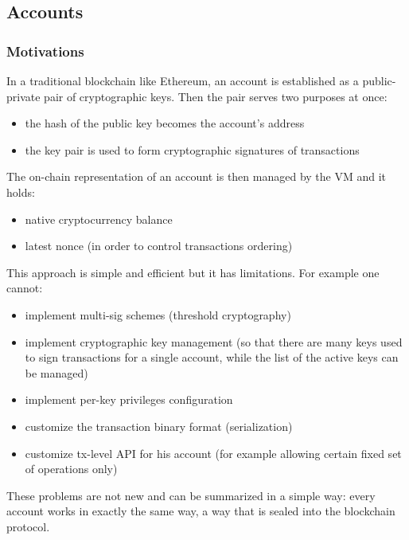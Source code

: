 \documentclass[a4paper]{article}
\begin{document}
\subsection{Accounts}

\subsubsection{Motivations}

In a traditional blockchain like Ethereum, an account is established as a public-private pair of cryptographic keys. Then the pair serves two purposes at once:

\begin{itemize}
  \item the hash of the public key becomes the account's address
  \item the key pair is used to form cryptographic signatures of transactions
\end{itemize}

The on-chain representation of an account is then managed by the VM and it holds:

\begin{itemize}
  \item native cryptocurrency balance
  \item latest nonce (in order to control transactions ordering)
\end{itemize}

This approach is simple and efficient but it has limitations. For example one cannot:

\begin{itemize}
  \item implement multi-sig schemes (threshold cryptography)
  \item implement cryptographic key management (so that there are many keys used to sign transactions for a single account, while the list of the active keys can be managed)
  \item implement per-key privileges configuration
  \item customize the transaction binary format (serialization)
  \item customize tx-level API for his account (for example allowing certain fixed set of operations only)
\end{itemize}

These problems are not new and can be summarized in a simple way: every account works in exactly the same way, a way that is sealed into the blockchain protocol.
\end{document}
